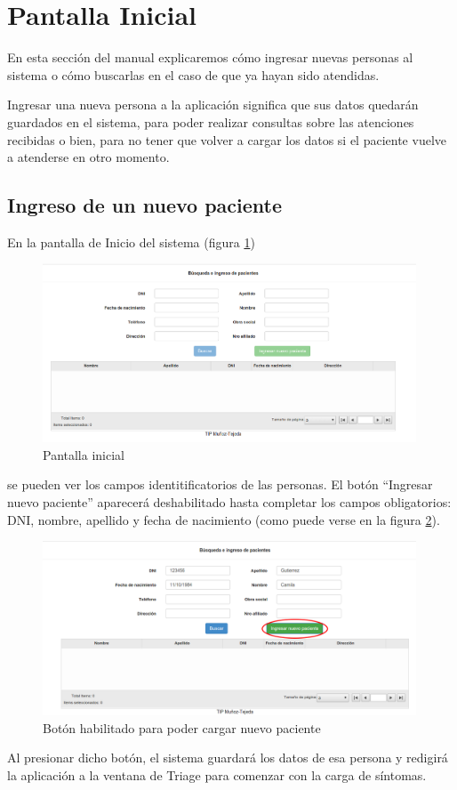 \section{Pantalla Inicial}
En esta sección del manual explicaremos cómo ingresar nuevas personas al sistema o cómo buscarlas en el caso de que ya hayan sido atendidas.

Ingresar una nueva persona a la aplicación significa que sus datos quedarán guardados en el sistema, para poder realizar consultas sobre las atenciones recibidas o bien, para no tener que volver a cargar los datos si el paciente vuelve a atenderse en otro momento.

\subsection{Ingreso de un nuevo paciente}
En la pantalla de Inicio del sistema (figura \ref{fig:inicio}) 
\begin{figure}
\centerline{\includegraphics[width=0.99\textwidth]{inicio.png}}
\caption{Pantalla inicial} \label{fig:inicio}
\end{figure}
se pueden ver los campos identitificatorios de las personas. El botón ``Ingresar nuevo paciente'' aparecerá deshabilitado hasta completar los campos obligatorios: DNI, nombre, apellido y fecha de nacimiento (como puede verse en la figura \ref{fig:inicio_nuevo}).
\begin{figure}
\centerline{\includegraphics[width=0.99\textwidth]{inicio_nuevo.png}}
\caption{Botón habilitado para poder cargar nuevo paciente} \label{fig:inicio_nuevo}
\end{figure}
Al presionar dicho botón, el sistema guardará los datos de esa persona y redigirá la aplicación a la ventana de Triage para comenzar con la carga de síntomas.

